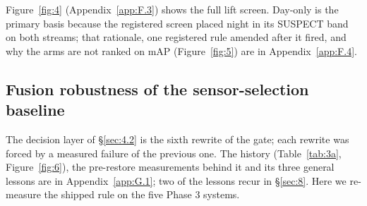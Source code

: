 \documentclass[10pt]{article}
\begin{document}
Figure~\ref{fig:4} (Appendix~\ref{app:F.3}) shows the full lift screen. Day-only is the primary basis because the registered screen placed night in its SUSPECT band on both streams; that rationale, one registered rule amended after it fired, and why the arms are not ranked on mAP (Figure~\ref{fig:5}) are in Appendix~\ref{app:F.4}.

\subsection{Fusion robustness of the sensor-selection baseline}\label{sec:6.3}
The decision layer of \S\ref{sec:4.2} is the sixth rewrite of the gate; each rewrite was forced by a measured failure of the previous one. The history (Table~\ref{tab:3a}, Figure~\ref{fig:6}), the pre-restore measurements behind it and its three general lessons are in Appendix~\ref{app:G.1}; two of the lessons recur in \S\ref{sec:8}. Here we re-measure the shipped rule on the five Phase 3 systems.
\end{document}
